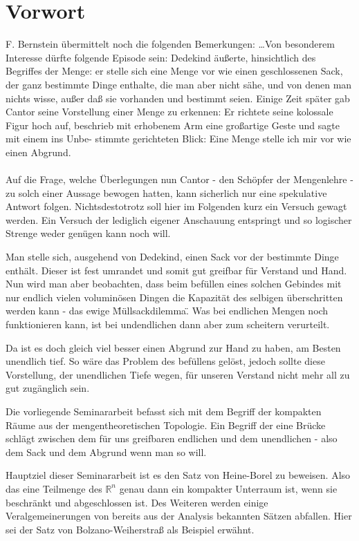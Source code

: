 \chapter{Vorwort}

F. Bernstein übermittelt noch die folgenden Bemerkungen:
\glqq \dots Von besonderem Interesse dürfte folgende Episode sein: Dedekind äußerte, hinsichtlich 
des Begriffes der Menge: er stelle sich eine Menge vor wie einen geschlossenen
Sack, der ganz bestimmte Dinge enthalte, die man aber nicht sähe, und von denen man
nichts wisse, außer daß sie vorhanden und bestimmt seien. Einige Zeit später gab Cantor
seine Vorstellung einer Menge zu erkennen: Er richtete seine kolossale Figur hoch auf,
beschrieb mit erhobenem Arm eine großartige Geste und sagte mit einem ins Unbe-
stimmte gerichteten Blick: \glqq Eine Menge stelle ich mir vor wie einen Abgrund.\grqq \grqq 
\\
\\

Auf die Frage, welche Überlegungen nun Cantor - den Schöpfer der Mengenlehre - 
zu solch einer Aussage bewogen hatten, kann sicherlich nur eine spekulative Antwort folgen.
Nichtsdestotrotz soll hier im Folgenden kurz ein Versuch gewagt werden. Ein Versuch der lediglich
eigener Anschauung entspringt und so logischer Strenge weder genügen kann noch will.

Man stelle sich, ausgehend von Dedekind, einen Sack vor der bestimmte Dinge enthält.
Dieser ist fest umrandet und somit gut greifbar für Verstand und Hand. Nun wird man
aber beobachten, dass beim befüllen eines solchen Gebindes mit nur endlich vielen voluminösen Dingen 
die Kapazität des selbigen überschritten werden kann - das ewige \"Müllsackdilemma\".
Was bei endlichen Mengen noch funktionieren kann, ist bei undendlichen dann aber zum scheitern verurteilt.

Da ist es doch gleich viel besser einen Abgrund zur Hand zu haben, am Besten unendlich tief. So wäre
das Problem des befüllens gelöst, jedoch sollte diese Vorstellung, der unendlichen Tiefe wegen, für unseren
Verstand nicht mehr all zu gut zugänglich sein.

Die vorliegende Seminararbeit befasst sich mit dem Begriff der kompakten Räume aus der mengentheoretischen
Topologie. Ein Begriff der eine Brücke schlägt zwischen dem für uns greifbaren endlichen und dem
unendlichen - also dem Sack und dem Abgrund wenn man so will.

Hauptziel dieser Seminararbeit ist es den Satz von Heine-Borel zu beweisen. Also das eine Teilmenge des
\(\mathbb{R}^n\) genau dann ein kompakter Unterraum ist, wenn sie beschränkt und abgeschlossen ist.
Des Weiteren werden einige Veralgemeinerungen von bereits aus der Analysis bekannten Sätzen abfallen.
Hier sei der Satz von Bolzano-Weiherstraß als Beispiel erwähnt.

